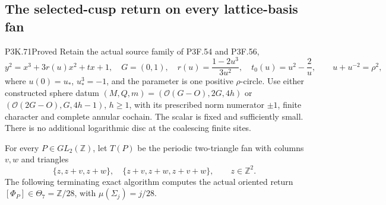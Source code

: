 \subsection{The selected-cusp return on every lattice-basis fan}
\begin{statement}{P3K.71}{Proved}
Retain the actual source family of P3F.54 and P3F.56,
\[
 y^2=x^3+3r(u)x^2+tx+1,\quad G=(0,1),\quad
 r(u)=\frac{1-2u^3}{3u^2},\quad t_0(u)=u^2-\frac2u,
 \qquad u+u^{-2}=\rho^2,
\]
where \(u(0)=u_*\), \(u_*^3=-1\), and the parameter is one positive
\(\rho\)-circle. Use either constructed sphere datum
\((M,Q,m)=(\mathcal O(G-O),2G,4h)\) or
\((\mathcal O(2G-O),G,4h-1)\), \(h\ge1\), with its prescribed
norm numerator \(\pm1\), finite character and complete annular
cochain. The scalar is fixed and sufficiently small. There is no
additional logarithmic disc at the coalescing finite sites.

For every \(P\in GL_2(\mathbb Z)\), let \(T(P)\) be the periodic
two-triangle fan with columns \(v,w\) and triangles
\[
 \{z,z+v,z+w\},\quad\{z+v,z+w,z+v+w\},\qquad z\in\mathbb Z^2.
\]
The following terminating exact algorithm computes the actual
oriented return \([\Phi_P]\in\Theta_7=\mathbb Z/28\), with
\(\mu(\Sigma_j)=j/28\).


\end{statement}
